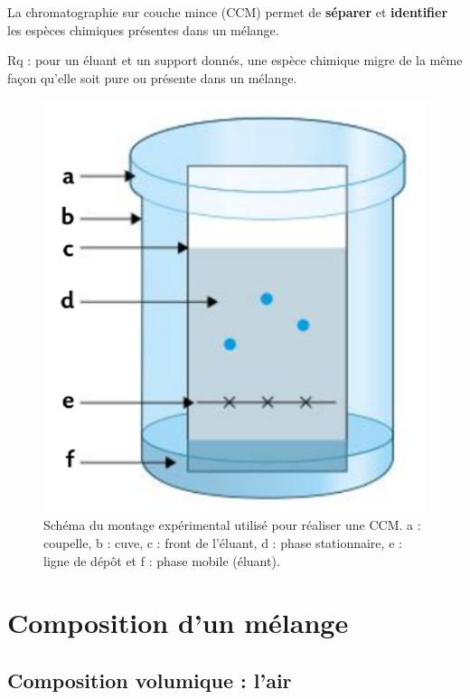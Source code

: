 \begin{definition}
La chromatographie sur couche mince (CCM) permet de \textbf{séparer} et \textbf{identifier} les espèces chimiques présentes dans un mélange.
\end{definition}
Rq : pour un éluant et un support donnés, une espèce chimique migre de la même façon qu'elle soit pure ou présente dans un mélange.

\begin{figure}[h]
\center
\includegraphics[scale=0.5]{images/ccm_schema.png}
\caption{Schéma du montage expérimental utilisé pour réaliser une CCM.
a : coupelle, b : cuve, c : front de l'éluant, d : phase stationnaire, e : ligne de dépôt et f : phase mobile (éluant).}
\end{figure}



\section{Composition d'un mélange}

\subsection{Composition volumique : l'air}

